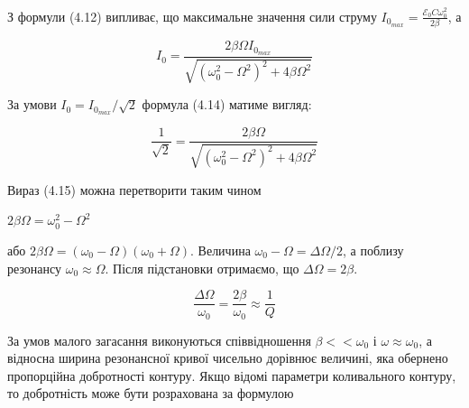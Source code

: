 \documentclass[12pt,a4paper]{article}
\begin{document}
    З формули (4.12) випливає,
    що максимальне значення сили струму $\displaystyle I_{0_{max}} = \frac{\mathcal{E}_0 C \omega_0^2}{2\beta}$,
    а

    \vspace{0.5em}

    \begin{equation}
        I_0 = \frac{2\beta \Omega I_{0_{max}}}{\sqrt{\left(\omega_0^2 - \Omega^2 \right)^2 + 4\beta \Omega^2}}
        \tag{4.14}
    \end{equation}

    \vspace{0.5em}

    За умови $I_0 = I_{0_{max}} / \sqrt{2}$ формула (4.14) матиме вигляд:

    \vspace{0.5em}

    \begin{equation}
        \frac{1}{\sqrt{2}} = \frac{2\beta \Omega}{\sqrt{\left(\omega_0^2 - \Omega^2 \right)^2 + 4\beta \Omega^2}}
        \tag{4.15}
    \end{equation}

    \vspace{0.5em}

    Вираз (4.15) можна перетворити таким чином

    \vspace{0.5em}

    \begin{center}
        $\displaystyle 2\beta \Omega = \omega_0^2 - \Omega^2$
    \end{center}

    \vspace{0.5em}

    або $2\beta \Omega = (\omega_0 - \Omega)(\omega_0 + \Omega)$.
    Величина $\omega_0 - \Omega = \Delta \Omega / 2$, а
    поблизу резонансу $\omega_0 \approx \Omega$.
    Після підстановки отримаємо, що $\Delta \Omega = 2\beta$.

    \vspace{0.5em}

    \begin{equation}
        \frac{\Delta \Omega}{\omega_0} = \frac{2 \beta}{\omega_0} \approx \frac{1}{Q}
        \tag{4.16}
    \end{equation}

    \vspace{0.5em}

    За умов малого загасання виконуються
    співвідношення $\beta << \omega_0$ і $\omega \approx \omega_0$, а відносна ширина
    резонансної кривої чисельно дорівнює величині,
    яка обернено пропорційна добротності контуру.
    Якщо відомі параметри коливального контуру,
    то добротність може бути розрахована за формулою
\end{document}
